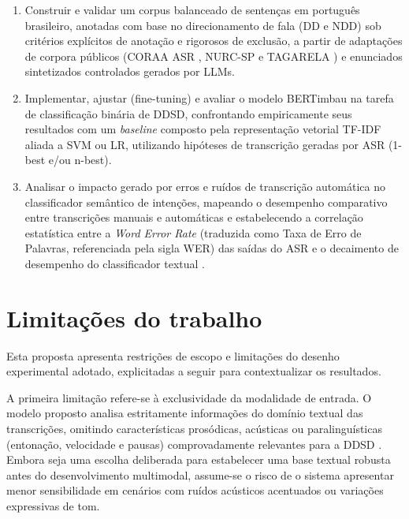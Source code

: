 \documentclass[
    12pt,                %
    openright,           %
    oneside,             %
    a4paper,             %
    english,             %
    brazil               %
]{abntex2}
\begin{document}
\begin{enumerate}
    \item Construir e validar um corpus balanceado de sentenças em português brasileiro, anotadas com base no direcionamento de fala (DD e NDD) sob critérios explícitos de anotação e rigorosos de exclusão, a partir de adaptações de corpora públicos (CORAA ASR \cite{CORAA2023}, NURC-SP \cite{NURCSP2025} e TAGARELA \cite{Tagarela2026}) e enunciados sintetizados controlados gerados por LLMs.

    \item Implementar, ajustar (fine-tuning) e avaliar o modelo BERTimbau \cite{Souza2020} na tarefa de classificação binária de DDSD, confrontando empiricamente seus resultados com um \textit{baseline} composto pela representação vetorial TF-IDF aliada a SVM ou LR, utilizando hipóteses de transcrição geradas por ASR (1-best e/ou n-best).

    \item Analisar o impacto gerado por erros e ruídos de transcrição automática no classificador semântico de intenções, mapeando o desempenho comparativo entre transcrições manuais e automáticas e estabelecendo a correlação estatística entre a \textit{Word Error Rate} (traduzida como Taxa de Erro de Palavras, referenciada pela sigla WER) das saídas do ASR e o decaimento de desempenho do classificador textual \cite{Dighe2024}.
\end{enumerate}


\section{Limitações do trabalho}
\label{sec:limitacoes}

Esta proposta apresenta restrições de escopo e limitações do desenho experimental adotado, explicitadas a seguir para contextualizar os resultados.

A primeira limitação refere-se à exclusividade da modalidade de entrada. O modelo proposto analisa estritamente informações do domínio textual das transcrições, omitindo características prosódicas, acústicas ou paralinguísticas (entonação, velocidade e pausas) comprovadamente relevantes para a DDSD \cite{Norouzian2019, Krishna2023}. Embora seja uma escolha deliberada para estabelecer uma base textual robusta antes do desenvolvimento multimodal, assume-se o risco de o sistema apresentar menor sensibilidade em cenários com ruídos acústicos acentuados ou variações expressivas de tom.
\end{document}
